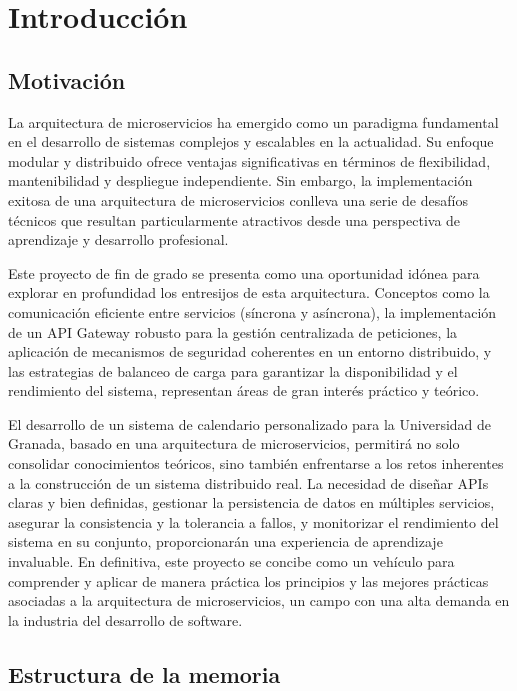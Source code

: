 \chapter{Introducción}\label{cap:introduccion}

\section{Motivación}

La arquitectura de microservicios ha emergido como un paradigma fundamental en el desarrollo de sistemas complejos y escalables en la actualidad. Su enfoque modular y distribuido ofrece ventajas significativas en términos de flexibilidad, mantenibilidad y despliegue independiente. Sin embargo, la implementación exitosa de una arquitectura de microservicios conlleva una serie de desafíos técnicos que resultan particularmente atractivos desde una perspectiva de aprendizaje y desarrollo profesional.

Este proyecto de fin de grado se presenta como una oportunidad idónea para explorar en profundidad los entresijos de esta arquitectura. Conceptos como la comunicación eficiente entre servicios (síncrona y asíncrona), la implementación de un API Gateway robusto para la gestión centralizada de peticiones, la aplicación de mecanismos de seguridad coherentes en un entorno distribuido, y las estrategias de balanceo de carga para garantizar la disponibilidad y el rendimiento del sistema, representan áreas de gran interés práctico y teórico.

El desarrollo de un sistema de calendario personalizado para la Universidad de Granada, basado en una arquitectura de microservicios, permitirá no solo consolidar conocimientos teóricos, sino también enfrentarse a los retos inherentes a la construcción de un sistema distribuido real. La necesidad de diseñar APIs claras y bien definidas, gestionar la persistencia de datos en múltiples servicios, asegurar la consistencia y la tolerancia a fallos, y monitorizar el rendimiento del sistema en su conjunto, proporcionarán una experiencia de aprendizaje invaluable. En definitiva, este proyecto se concibe como un vehículo para comprender y aplicar de manera práctica los principios y las mejores prácticas asociadas a la arquitectura de microservicios, un campo con una alta demanda en la industria del desarrollo de software.

\section{Estructura de la memoria}

